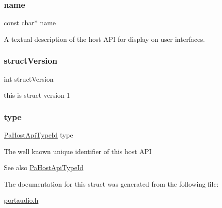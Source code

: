 \subsubsection{\texorpdfstring{name}{name}}
{\footnotesize\ttfamily const char$\ast$ name}

A textual description of the host A\+PI for display on user interfaces. \mbox{\label{struct_pa_host_api_info_a427b2098449590745eb8e4443f0b4ef8}} 
\subsubsection{\texorpdfstring{struct\+Version}{structVersion}}
{\footnotesize\ttfamily int struct\+Version}

this is struct version 1 \mbox{\label{struct_pa_host_api_info_add416e1a2544c70972c8ce82db481a1f}} 
\subsubsection{\texorpdfstring{type}{type}}
{\footnotesize\ttfamily \hyperlink{portaudio_8h_a8eaebe3d39c5ea45598da8f86dc2e5ae}{Pa\+Host\+Api\+Type\+Id} type}

The well known unique identifier of this host A\+PI \begin{DoxySeeAlso}{See also}
\hyperlink{portaudio_8h_ae247ec252e84112170079ece319fc42c}{Pa\+Host\+Api\+Type\+Id} 
\end{DoxySeeAlso}


The documentation for this struct was generated from the following file\+:\begin{DoxyCompactItemize}
\item 
\hyperlink{portaudio_8h}{portaudio.\+h}\end{DoxyCompactItemize}
